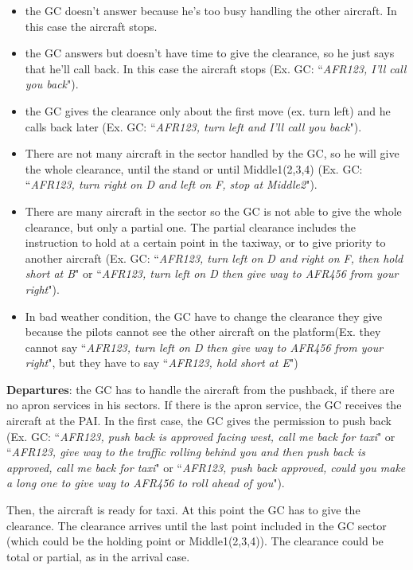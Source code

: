 \documentclass{article}
\begin{document}
\begin{itemize}
	\item the GC doesn't answer because he's too busy handling the other aircraft. In this case the aircraft stops.
	\item the GC answers but doesn't have time to give the clearance, so he just says that he'll call back. In this case the aircraft stops (Ex. GC: ``\textit{AFR123, I'll call you back}").
	\item the GC gives the clearance only about the first move (ex. turn left) and he calls back later (Ex. GC: ``\textit{AFR123, turn left and I'll call you back}").
	\item There are not many aircraft in the sector handled by the GC, so he will give the whole clearance, until the stand or until Middle1(2,3,4) (Ex. GC: ``\textit{AFR123, turn right on D and left on F, stop at Middle2}").
	\item There are many aircraft in the sector so the GC is not able to give the whole clearance, but only a partial one. The partial clearance includes the instruction to hold at a certain point in the taxiway, or to give priority to another aircraft (Ex. GC: ``\textit{AFR123, turn left on D and right on F, then hold short at B}" or ``\textit{AFR123, turn left on D then give way to AFR456 from your right}").
	\item In bad weather condition, the GC have to change the clearance they give because the pilots cannot see the other aircraft on the platform(Ex. they cannot say ``\textit{AFR123, turn left on D then give way to AFR456 from your right}", but they have to say ``\textit{AFR123, hold short at E}")
\end{itemize}

\textbf{Departures}: the GC has to handle the aircraft from the pushback, if there are no apron services in his sectors. If there is the apron service, the GC receives the aircraft at the PAI. 
In the first case, the GC gives the permission to push back (Ex. GC: ``\textit{AFR123, push back is approved facing west, call me back for taxi}" or ``\textit{AFR123, give way to the traffic rolling behind you and then push back is approved, call me back for taxi}" or ``\textit{AFR123, push back approved, could you make a long one to give way to AFR456 to roll ahead of you}"). 

Then, the aircraft is ready for taxi. At this point the GC has to give the clearance. The clearance arrives until the last point included in the GC sector (which could be the holding point or Middle1(2,3,4)). The clearance could be total or partial, as in the arrival case.
\end{document}
